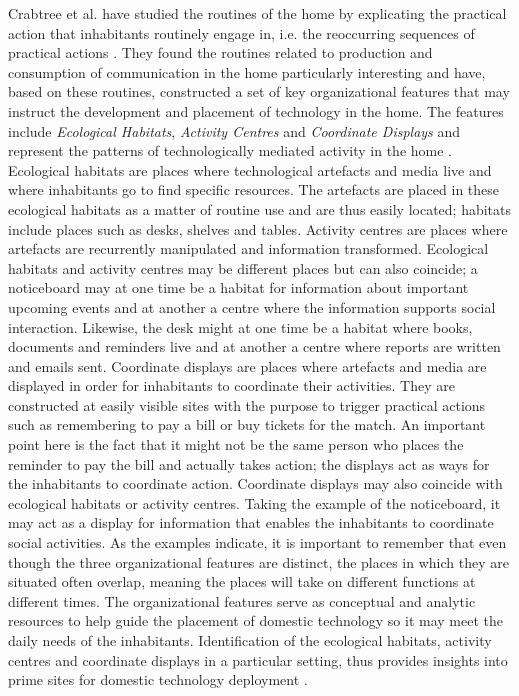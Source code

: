 Crabtree et al. have studied the routines of the home by explicating the practical action that inhabitants routinely engage in, i.e. the reoccurring sequences of practical actions \cite {crabtree2004domestic}. They found the routines related to production and consumption of communication in the home particularly interesting and have, based on these routines, constructed a set of key organizational features that may instruct the development and placement of technology in the home. The features include \emph{Ecological Habitats}, \emph{Activity Centres} and \emph{Coordinate Displays} and represent the patterns of technologically mediated activity in the home \cite{rodden2004between}. Ecological habitats are places where technological artefacts and media live and where inhabitants go to find specific resources. The artefacts are placed in these ecological habitats as a matter of routine use and are thus easily located; habitats include places such as desks, shelves and tables. Activity centres are places where artefacts are recurrently manipulated and information transformed. Ecological habitats and activity centres may be different places but can also coincide; a noticeboard may at one time be a habitat for information about important upcoming events and at another a centre where the information supports social interaction. Likewise, the desk might at one time be a habitat where books, documents and reminders live and at another a centre where reports are written and emails sent. Coordinate displays are places where artefacts and media are displayed in order for inhabitants to coordinate their activities. They are constructed at easily visible sites with the purpose to trigger practical actions such as remembering to pay a bill or buy tickets for the match. An important point here is the fact that it might not be the same person who places the reminder to pay the bill and actually takes action; the displays act as ways for the inhabitants to coordinate action. Coordinate displays may also coincide with ecological habitats or activity centres. Taking the example of the noticeboard, it may act as a display for information that enables the inhabitants to coordinate social activities. As the examples indicate, it is important to remember that even though the three organizational features are distinct, the places in which they are situated often overlap, meaning the places will take on different functions at different times. The organizational features serve as conceptual and analytic resources to help guide the placement of domestic technology so it may meet the daily needs of the inhabitants. Identification of the ecological habitats, activity centres and coordinate displays in a particular setting, thus provides insights into prime sites for domestic technology deployment \cite{crabtree2003finding}.

